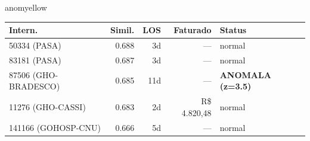 \documentclass[a4paper,10pt]{article}
\begin{document}
\begin{anomalycard}[Internacao 167357 | GHO-PETROBRAS | MODERADO (z=2.62)]{anomyellow}
\begin{tabular}{l r r r l}\toprule\textbf{Intern.} & \textbf{Simil.} & \textbf{LOS} & \textbf{Faturado} & \textbf{Status} \\\midrule
50334 (PASA) & 0.688 & 3d & --- & \textcolor{jcubeblue}{normal} \\
83181 (PASA) & 0.687 & 3d & --- & \textcolor{jcubeblue}{normal} \\
87506 (GHO-BRADESCO) & 0.685 & 11d & --- & \textcolor{anomred}{\textbf{ANOMALA (z=3.5)}} \\
11276 (GHO-CASSI) & 0.683 & 2d & R\$ 4.820,48 & \textcolor{jcubeblue}{normal} \\
141166 (GOHOSP-CNU) & 0.666 & 5d & --- & \textcolor{jcubeblue}{normal} \\
\bottomrule\end{tabular}


\end{anomalycard}

\newpage
\end{document}
